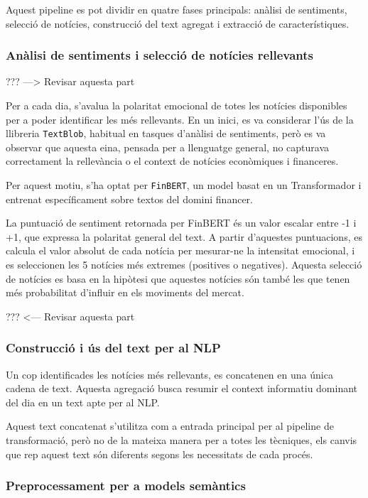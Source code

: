 \documentclass[12pt,a4paper,twoside]{book}
\begin{document}
Aquest pipeline es pot dividir en quatre fases principals: anàlisi de sentiments, selecció de notícies, construcció del text agregat i extracció de característiques.

\subsubsection{Anàlisi de sentiments i selecció de notícies rellevants}
??? ---> Revisar aquesta part

Per a cada dia, s'avalua la polaritat emocional de totes les notícies disponibles per a poder identificar les més rellevants. En un inici, es va considerar l'ús de la llibreria \texttt{TextBlob}, habitual en tasques d'anàlisi de sentiments, però es va observar que aquesta eina, pensada per a llenguatge general, no capturava correctament la rellevància o el context de notícies econòmiques i financeres.

Per aquest motiu, s'ha optat per \texttt{FinBERT}, un model basat en un Transformador i entrenat específicament sobre textos del domini financer.

La puntuació de sentiment retornada per FinBERT és un valor escalar entre -1 i +1, que expressa la polaritat general del text. A partir d'aquestes puntuacions, es calcula el valor absolut de cada notícia per mesurar-ne la intensitat emocional, i es seleccionen les 5 notícies més extremes (positives o negatives). Aquesta selecció de notícies es basa en la hipòtesi que aquestes notícies són també les que tenen més probabilitat d'influir en els moviments del mercat.

??? <--- Revisar aquesta part

\subsubsection{Construcció i ús del text per al NLP}

Un cop identificades les notícies més rellevants, es concatenen en una única cadena de text. Aquesta agregació busca resumir el context informatiu dominant del dia en un text apte per al NLP.

Aquest text concatenat s'utilitza com a entrada principal per al pipeline de transformació, però no de la mateixa manera per a totes les tècniques, els canvis que rep aquest text són diferents segons les necessitats de cada procés.

\subsubsection{Preprocessament per a models semàntics}
\end{document}
